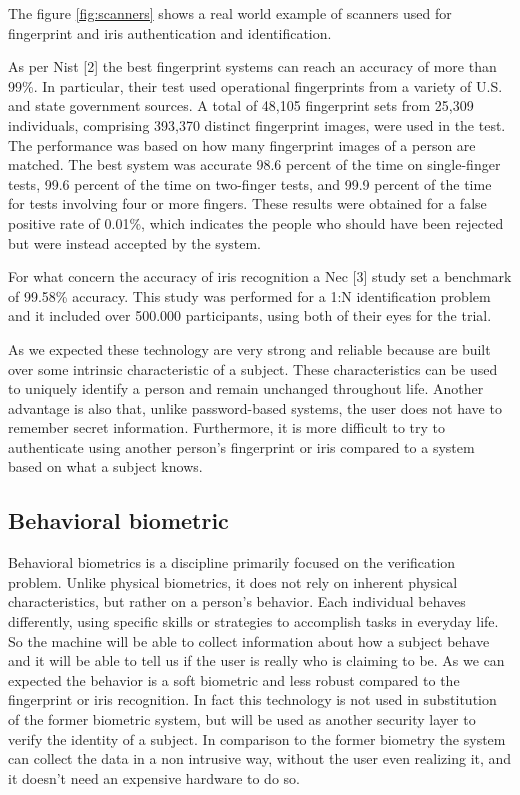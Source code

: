 \documentclass{article}
\begin{document}
The figure \ref{fig:scanners} shows a real world example of scanners used for fingerprint and iris authentication and identification.

As per Nist [2] the best fingerprint systems can reach an accuracy of more than 99\%.
In particular, their test used operational fingerprints from a variety of U.S. and state government sources. 
A total of 48,105 fingerprint sets from 25,309 individuals, comprising 393,370 distinct fingerprint images, were used in the test.
The performance was based on how many fingerprint images of a person are matched.
The best system was accurate 98.6 percent of the time on single-finger tests, 99.6 percent of the time on two-finger tests, and 99.9 percent of the time for tests involving four or more fingers.
These results were obtained for a false positive rate of 0.01\%, which indicates the people who should have been rejected but were instead accepted by the system.

For what concern the accuracy of iris recognition a Nec [3] study set a benchmark of 99.58\% accuracy.
This study was performed for a 1:N identification problem and it included over 500.000 participants, using both of their eyes for the trial.

As we expected these technology are very strong and reliable because are built over some intrinsic characteristic of a subject.
These characteristics can be used to uniquely identify a person and remain unchanged throughout life.
Another advantage is also that, unlike password-based systems, the user does not have to remember secret information.
Furthermore, it is more difficult to try to authenticate using another person's fingerprint or iris compared to a system based on what a subject knows.

\subsection{Behavioral biometric}

Behavioral biometrics is a discipline primarily focused on the verification problem.
Unlike physical biometrics, it does not rely on inherent physical characteristics, but rather on a person's behavior. 
Each individual behaves differently, using specific skills or strategies to accomplish tasks in everyday life.
So the machine will be able to collect information about how a subject behave and it will be able to tell us if the user is really who is claiming to be.
As we can expected the behavior is a soft biometric and less robust compared to the fingerprint or iris recognition.
In fact this technology is not used in substitution of the former biometric system, but will be used as another security layer to verify the identity of a subject.
In comparison to the former biometry the system can collect the data in a non intrusive way, without the user even realizing it, and it doesn't need an expensive hardware to do so.
\end{document}
